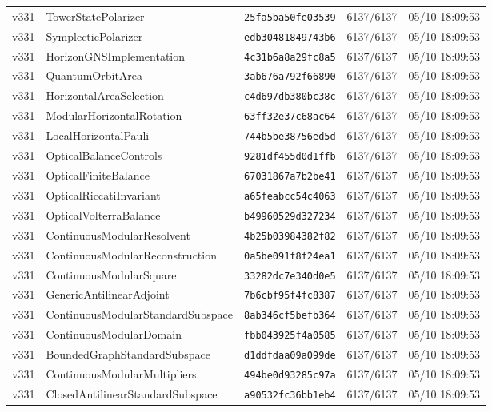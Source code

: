 \documentclass[11pt]{article}
\theoremstyle{definition}\newtheorem{deriv}{Derivação}
\begin{document}
{\begin{longtable}{@{}lllll@{}}
v331 & TowerStatePolarizer & \texttt{25fa5ba50fe03539} & 6137/6137 & 05/10 18:09:53 \\
v331 & SymplecticPolarizer & \texttt{edb30481849743b6} & 6137/6137 & 05/10 18:09:53 \\
v331 & HorizonGNSImplementation & \texttt{4c31b6a8a29fc8a5} & 6137/6137 & 05/10 18:09:53 \\
v331 & QuantumOrbitArea & \texttt{3ab676a792f66890} & 6137/6137 & 05/10 18:09:53 \\
v331 & HorizontalAreaSelection & \texttt{c4d697db380bc38c} & 6137/6137 & 05/10 18:09:53 \\
v331 & ModularHorizontalRotation & \texttt{63ff32e37c68ac64} & 6137/6137 & 05/10 18:09:53 \\
v331 & LocalHorizontalPauli & \texttt{744b5be38756ed5d} & 6137/6137 & 05/10 18:09:53 \\
v331 & OpticalBalanceControls & \texttt{9281df455d0d1ffb} & 6137/6137 & 05/10 18:09:53 \\
v331 & OpticalFiniteBalance & \texttt{67031867a7b2be41} & 6137/6137 & 05/10 18:09:53 \\
v331 & OpticalRiccatiInvariant & \texttt{a65feabcc54c4063} & 6137/6137 & 05/10 18:09:53 \\
v331 & OpticalVolterraBalance & \texttt{b49960529d327234} & 6137/6137 & 05/10 18:09:53 \\
v331 & ContinuousModularResolvent & \texttt{4b25b03984382f82} & 6137/6137 & 05/10 18:09:53 \\
v331 & ContinuousModularReconstruction & \texttt{0a5be091f8f24ea1} & 6137/6137 & 05/10 18:09:53 \\
v331 & ContinuousModularSquare & \texttt{33282dc7e340d0e5} & 6137/6137 & 05/10 18:09:53 \\
v331 & GenericAntilinearAdjoint & \texttt{7b6cbf95f4fc8387} & 6137/6137 & 05/10 18:09:53 \\
v331 & ContinuousModularStandardSubspace & \texttt{8ab346cf5befb364} & 6137/6137 & 05/10 18:09:53 \\
v331 & ContinuousModularDomain & \texttt{fbb043925f4a0585} & 6137/6137 & 05/10 18:09:53 \\
v331 & BoundedGraphStandardSubspace & \texttt{d1ddfdaa09a099de} & 6137/6137 & 05/10 18:09:53 \\
v331 & ContinuousModularMultipliers & \texttt{494be0d93285c97a} & 6137/6137 & 05/10 18:09:53 \\
v331 & ClosedAntilinearStandardSubspace & \texttt{a90532fc36bb1eb4} & 6137/6137 & 05/10 18:09:53 \\

\end{longtable}}
\end{document}
